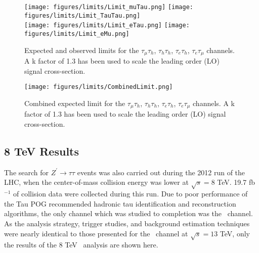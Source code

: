 
\begin{figure}[tbh!]
  \centering
  \texttt{[image: figures/limits/Limit\_muTau.png]}
  \texttt{[image: figures/limits/Limit\_TauTau.png]}\\
  \texttt{[image: figures/limits/Limit\_eTau.png]}
  \texttt{[image: figures/limits/Limit\_eMu.png]}
  \caption{Expected and observed limits for the $\tau_{\mu}\tau_{h}$, $\tau_{h}\tau_{h}$, $\tau_{e}\tau_{h}$, $\tau_{e}\tau_{\mu}$ channels. A k factor of 1.3 has been used to scale the leading order (LO) signal cross-section.} 
    \label{fig:Limits}
\end{figure}

\begin{figure}[tbh!]
  \centering
  \texttt{[image: figures/limits/CombinedLimit.png]}
  \caption{Combined expected limit for the $\tau_{\mu}\tau_{h}$, $\tau_{h}\tau_{h}$, $\tau_{e}\tau_{h}$, $\tau_{e}\tau_{\mu}$ channels. A k factor of 1.3 has been used to scale the leading order (LO) signal cross-section.}
  \label{fig:CombinedLimits}
\end{figure}



\subsection{8 TeV Results}

The search for $Z^{\prime}\to\tau\tau$ events was also carried out during the 2012 run of the LHC, when the center-of-mass collision energy was lower at $\sqrt{s} = 8$ TeV. 19.7 fb$^{-1}$ of collision data were collected during this run. Due to poor performance of the Tau POG recommended hadronic tau identification and reconstruction algorithms, the only channel which was studied to completion was the \emu ~channel. As the analysis strategy, trigger studies, and background estimation techniques were nearly identical to those presented for the \emu ~channel at $\sqrt{s} = 13$ TeV, only the results of the 8 TeV \emu ~analysis are shown here.

